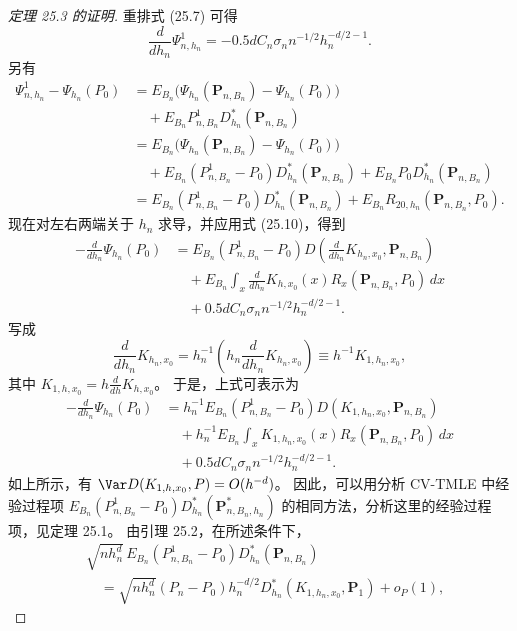 \begin{proof}[定理 25.3 的证明]
重排式 (25.7) 可得
\begin{equation}
 \frac{d}{dh_n}\Psi^1_{n,h_n}
 =-0.5dC_n\sigma_nn^{-1/2}h_n^{-d/2-1}.
\tag{25.10}
\end{equation}
另有
\[
\begin{aligned}
 \Psi^1_{n,h_n}-\Psi_{h_n}(P_0)
 &=E_{B_n}\bigl(\Psi_{h_n}(\mathbf P_{n,B_n})-\Psi_{h_n}(P_0)\bigr)\\
 &\quad+E_{B_n}P^1_{n,B_n}D_{h_n}^*(\mathbf P_{n,B_n})\\
 &=E_{B_n}\bigl(\Psi_{h_n}(\mathbf P_{n,B_n})-\Psi_{h_n}(P_0)\bigr)\\
 &\quad+E_{B_n}(P^1_{n,B_n}-P_0)D_{h_n}^*(\mathbf P_{n,B_n})
 +E_{B_n}P_0D_{h_n}^*(\mathbf P_{n,B_n})\\
 &=E_{B_n}(P^1_{n,B_n}-P_0)D_{h_n}^*(\mathbf P_{n,B_n})
 +E_{B_n}R_{20,h_n}(\mathbf P_{n,B_n},P_0).
\end{aligned}
\]
现在对左右两端关于 $h_n$ 求导，并应用式 (25.10)，得到
\[
\begin{aligned}
 -\frac{d}{dh_n}\Psi_{h_n}(P_0)
 &=E_{B_n}(P^1_{n,B_n}-P_0)
 D\left(\frac{d}{dh_n}K_{h_n,x_0},\mathbf P_{n,B_n}\right)\\
 &\quad+E_{B_n}\int_x\frac{d}{dh_n}K_{h,x_0}(x)
 R_x(\mathbf P_{n,B_n},P_0)\,dx\\
 &\quad+0.5dC_n\sigma_nn^{-1/2}h_n^{-d/2-1}.
\end{aligned}
\]
写成
\[
 \frac{d}{dh_n}K_{h_n,x_0}
 =h_n^{-1}\left(h_n\frac{d}{dh_n}K_{h_n,x_0}\right)
 \equiv h^{-1}K_{1,h_n,x_0},
\]
其中 $K_{1,h,x_0}=h\frac{d}{dh}K_{h,x_0}$。
于是，上式可表示为
\[
\begin{aligned}
 -\frac{d}{dh_n}\Psi_{h_n}(P_0)
 &=h_n^{-1}E_{B_n}(P^1_{n,B_n}-P_0)
 D(K_{1,h_n,x_0},\mathbf P_{n,B_n})\\
 &\quad+h_n^{-1}E_{B_n}\int_xK_{1,h_n,x_0}(x)
 R_x(\mathbf P_{n,B_n},P_0)\,dx\\
 &\quad+0.5dC_n\sigma_nn^{-1/2}h_n^{-d/2-1}.
\end{aligned}
\]
如上所示，有 $\Var D(K_{1,h,x_0},P)=O(h^{-d})$。
因此，可以用分析 CV-TMLE 中经验过程项
$E_{B_n}(P^1_{n,B_n}-P_0)D_{h_n}^*(\mathbf P^*_{n,B_n,h_n})$
的相同方法，分析这里的经验过程项，见定理 25.1。
由引理 25.2，在所述条件下，
\[
\begin{aligned}
 &\sqrt{nh_n^d}\,E_{B_n}(P^1_{n,B_n}-P_0)
 D_{h_n}^*(\mathbf P_{n,B_n})\\
 &\quad=\sqrt{nh_n^d}(P_n-P_0)h_n^{-d/2}
 D_{h_n}^*(K_{1,h_n,x_0},\mathbf P_1)+o_P(1),
\end{aligned}
\]
\end{proof}
